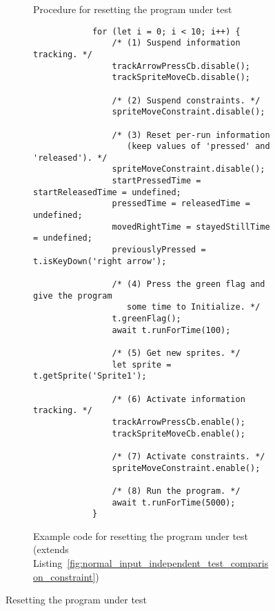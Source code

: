 \begin{figure}[htpb]
\begin{subfigure}[m]{.3\textwidth}
\begin{tikzpicture}[scale=0.9, every node/.style={scale=0.9}]
        \end{tikzpicture}
        \caption{Procedure for resetting the program under test}
        \label{fig:resetting_the_program_under_test_procedure}
    \end{subfigure}%
    \hspace{.13\textwidth}%
    \begin{subfigure}[m]{.55\textwidth}
        \centering
        \begin{verbatim}
            for (let i = 0; i < 10; i++) {
                /* (1) Suspend information tracking. */
                trackArrowPressCb.disable();
                trackSpriteMoveCb.disable();

                /* (2) Suspend constraints. */
                spriteMoveConstraint.disable();

                /* (3) Reset per-run information
                   (keep values of 'pressed' and 'released'). */
                spriteMoveConstraint.disable();
                startPressedTime = startReleasedTime = undefined;
                pressedTime = releasedTime = undefined;
                movedRightTime = stayedStillTime = undefined;
                previouslyPressed = t.isKeyDown('right arrow');

                /* (4) Press the green flag and give the program
                   some time to Initialize. */
                t.greenFlag();
                await t.runForTime(100);

                /* (5) Get new sprites. */
                let sprite = t.getSprite('Sprite1');

                /* (6) Activate information tracking. */
                trackArrowPressCb.enable();
                trackSpriteMoveCb.enable();

                /* (7) Activate constraints. */
                spriteMoveConstraint.enable();

                /* (8) Run the program. */
                await t.runForTime(5000);
            }
        \end{verbatim}
        \vspace{-\bigskipamount}
        \caption{Example code for resetting the program under test (extends Listing~\ref{fig:normal_input_independent_test_comparison_constraint})}
        \label{fig:resetting_the_program_under_test_example}
    \end{subfigure}

    \caption{Resetting the program under test}
    \label{fig:resetting_the_program_under_test}
\end{figure}


